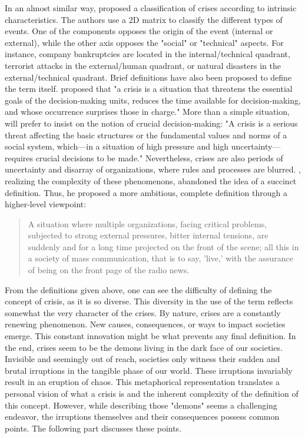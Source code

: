 In an almost similar way, \textcite{mitroffStructureManmadeOrganizational1988} proposed a classification of crises according to intrinsic characteristics.
The authors use a 2D matrix to classify the different types of events.
One of the components opposes the origin of the event (internal or external), while the other axis opposes the "social" or "technical" aspects.
For instance, company bankruptcies are located in the internal/technical quadrant, terrorist attacks in the external/human quadrant, or natural disasters in the external/technical quadrant.
Brief definitions have also been proposed to define the term itself.
\textcite{hermannIssuesStudyInternational1972} proposed that "a crisis is a situation that threatens the essential goals of the decision-making units,
reduces the time available for decision-making, and whose occurrence surprises those in charge."
More than a simple situation, \textcite{rosenthalCrisisDecisionMakingNetherlands1986} will prefer to insist on the notion of crucial decision-making:
"A crisis is a serious threat affecting the basic structures or the fundamental values and norms of a social system, which—in a situation of high pressure and high uncertainty—requires crucial decisions to be made."
Nevertheless, crises are also periods of uncertainty and disarray of organizations, where rules and processes are blurred.
\textcite{lagadecGESTIONCRISES1994}, realizing the complexity of these phenomenons, abandoned the idea of a succinct definition.
Thus, he proposed a more ambitious, complete definition through a higher-level viewpoint:
\blockquote{A situation where multiple organizations, facing critical problems, subjected to strong external pressures, bitter internal tensions, are suddenly and for a long time projected on the front of the scene;
    all this in a society of mass communication, that is to say, 'live,' with the assurance of being on the front page of the radio news.}

From the definitions given above, one can see the difficulty of defining the concept of crisis, as it is so diverse.
This diversity in the use of the term reflects somewhat the very character of the crises.
By nature, crises are a constantly renewing phenomenon.
New causes, consequences, or ways to impact societies emerge.
This constant innovation might be what prevents any final definition.
In the end, crises seem to be the demons living in the dark face of our societies.
Invisible and seemingly out of reach, societies only witness their sudden and brutal irruptions in the tangible phase of our world.
These irruptions invariably result in an eruption of chaos.
This metaphorical representation translates a personal vision of what a crisis is and the inherent complexity of the definition of this concept.
However, while describing those "demons" seems a challenging endeavor, the irruptions themselves and their consequences possess common points.
The following part discusses these points.

